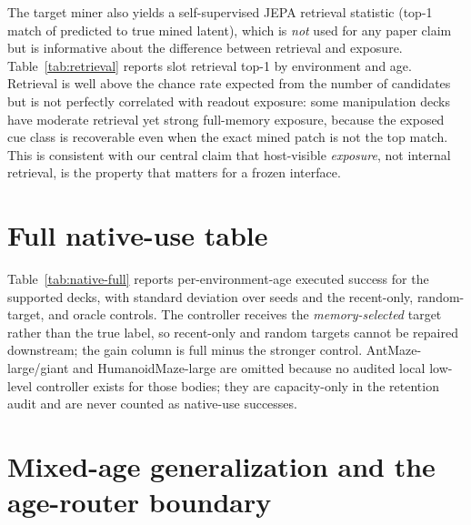The target miner also yields a self-supervised JEPA retrieval statistic
(top-1 match of predicted to true mined latent), which is \emph{not} used for
any paper claim but is informative about the difference between retrieval and
exposure.  Table~\ref{tab:retrieval} reports slot retrieval top-1 by
environment and age.  Retrieval is well above the chance rate expected from the
number of candidates but is not perfectly correlated with readout exposure: some
manipulation decks have moderate retrieval yet strong full-memory exposure,
because the exposed cue class is recoverable even when the exact mined patch is
not the top match.  This is consistent with our central claim that host-visible
\emph{exposure}, not internal retrieval, is the property that matters for a
frozen interface.

\begin{table}[h]
\centering
\footnotesize
\caption{Slot-memory JEPA retrieval top-1 by environment and age
(diagnostic only; not used for gating).}
\label{tab:retrieval}

\end{table}

\section{Full native-use table}
\label{app:native}

Table~\ref{tab:native-full} reports per-environment-age executed success for the
supported decks, with standard deviation over seeds and the recent-only,
random-target, and oracle controls.  The controller receives the
\emph{memory-selected} target rather than the true label, so recent-only and
random targets cannot be repaired downstream; the gain column is full minus the
stronger control.  AntMaze-large/giant and HumanoidMaze-large are omitted because
no audited local low-level controller exists for those bodies; they are
capacity-only in the retention audit and are never counted as native-use
successes.

\begin{table}[h]
\centering
\footnotesize
\caption{Per-environment-age fixed-controller native use on supported decks.
Full is mean\,$\pm$\,std executed success over seeds; gain is full minus the
stronger of recent/random.}
\label{tab:native-full}

\end{table}

\section{Mixed-age generalization and the age-router boundary}
\label{app:autoage}

